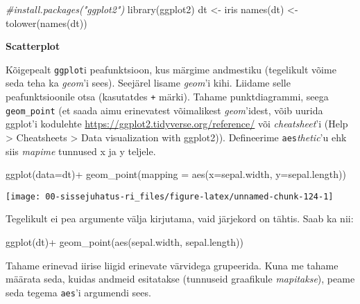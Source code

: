 \documentclass[
]{book}
\newenvironment{Shaded}{\begin{snugshade}}{\end{snugshade}}
\newcommand{\AttributeTok}[1]{\textcolor[rgb]{0.77,0.63,0.00}{#1}}
\newcommand{\CommentTok}[1]{\textcolor[rgb]{0.56,0.35,0.01}{\textit{#1}}}
\newcommand{\FunctionTok}[1]{\textcolor[rgb]{0.00,0.00,0.00}{#1}}
\newcommand{\NormalTok}[1]{#1}
\newcommand{\OtherTok}[1]{\textcolor[rgb]{0.56,0.35,0.01}{#1}}
\newcommand{\SpecialCharTok}[1]{\textcolor[rgb]{0.00,0.00,0.00}{#1}}
\begin{document}
\begin{Shaded}
\begin{Highlighting}[]
\CommentTok{\#install.packages("ggplot2")}
\FunctionTok{library}\NormalTok{(ggplot2)}
\NormalTok{dt }\OtherTok{\textless{}{-}}\NormalTok{ iris}
\FunctionTok{names}\NormalTok{(dt) }\OtherTok{\textless{}{-}} \FunctionTok{tolower}\NormalTok{(}\FunctionTok{names}\NormalTok{(dt))}
\end{Highlighting}
\end{Shaded}

\textbf{Scatterplot}

Kõigepealt \texttt{ggplot}i peafunktsioon, kus märgime andmestiku (tegelikult võime seda teha ka \emph{geom}'i sees). Seejärel lisame \emph{geom}'i kihi. Liidame selle peafunktsioonile otsa (kasutatdes \texttt{+} märki). Tahame punktdiagrammi, seega \texttt{geom\_point} (et saada aimu erinevatest võimalikest \emph{geom}'idest, võib uurida ggplot'i kodulehte \url{https://ggplot2.tidyverse.org/reference/} või \emph{cheatsheet}'i (Help \textgreater{} Cheatsheets \textgreater{} Data visualization with ggplot2)). Defineerime \texttt{aes}\emph{thetic}'u ehk siis \emph{mapime} tunnused x ja y teljele.

\begin{Shaded}
\begin{Highlighting}[]
\FunctionTok{ggplot}\NormalTok{(}\AttributeTok{data=}\NormalTok{dt)}\SpecialCharTok{+}
  \FunctionTok{geom\_point}\NormalTok{(}\AttributeTok{mapping =} \FunctionTok{aes}\NormalTok{(}\AttributeTok{x=}\NormalTok{sepal.width, }\AttributeTok{y=}\NormalTok{sepal.length))}
\end{Highlighting}
\end{Shaded}

\begin{center}\texttt{[image: 00-sissejuhatus-ri\_files/figure-latex/unnamed-chunk-124-1]} \end{center}

Tegelikult ei pea argumente välja kirjutama, vaid järjekord on tähtis. Saab ka nii:

\begin{Shaded}
\begin{Highlighting}[]
\FunctionTok{ggplot}\NormalTok{(dt)}\SpecialCharTok{+}
  \FunctionTok{geom\_point}\NormalTok{(}\FunctionTok{aes}\NormalTok{(sepal.width, sepal.length))}
\end{Highlighting}
\end{Shaded}

Tahame erinevad iirise liigid erinevate värvidega grupeerida. Kuna me tahame määrata seda, kuidas andmeid esitatakse (tunnuseid graafikule \emph{mapitakse}), peame seda tegema \texttt{aes}'i argumendi sees.
\end{document}
